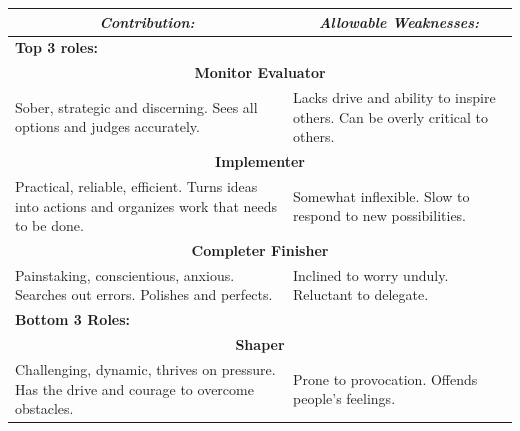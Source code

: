 \begin{table}[ht]
\centering
\begin{tabular}{|p{}|p{}|}
\hline
\multicolumn{1}{|c|}{\textit{Contribution:}}                                                      & \multicolumn{1}{c|}{\textit{Allowable Weaknesses:}}                          \\ \hline
\multicolumn{2}{|l|}{\textbf{Top 3 roles:}}                                                                                                                                      \\ \hline
\multicolumn{2}{|c|}{\textbf{Monitor Evaluator}}                                                                                                                                 \\ \hline
Sober, strategic and discerning. Sees all options and judges accurately.                          & Lacks drive and ability to inspire others. Can be overly critical to others. \\ \hline
\multicolumn{2}{|c|}{\textbf{Implementer}}                                                                                                                                       \\ \hline
Practical, reliable, efficient. Turns ideas into actions and organizes work that needs to be done.& Somewhat inflexible. Slow to respond to new possibilities.                   \\ \hline
\multicolumn{2}{|c|}{\textbf{Completer Finisher}}                                                                                                                                \\ \hline
Painstaking, conscientious, anxious. Searches out errors. Polishes and perfects.                  & Inclined to worry unduly. Reluctant to delegate.                             \\ \hline
\multicolumn{2}{|l|}{\textbf{Bottom 3 Roles:}}                                                                                                                                   \\ \hline
\multicolumn{2}{|c|}{\textbf{Shaper}}                                                                                                                                            \\ \hline
Challenging, dynamic, thrives on pressure. Has the drive and courage to overcome obstacles.       & Prone to provocation. Offends people's feelings.                             \\ \hline

\end{tabular}
\end{table}
